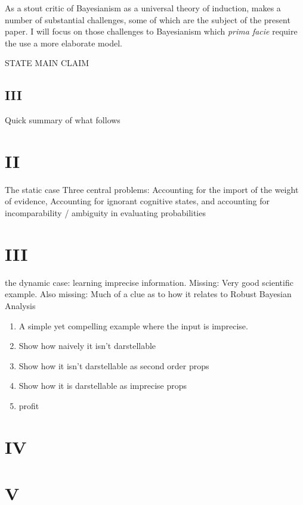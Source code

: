 \documentclass[11pt, a4paper]{scrartcl}
\begin{document}
As a stout critic of Bayesianism as a universal theory of induction, \cite{Norton2011-NORCTB} makes a number of substantial challenges, some of which are the subject of the present paper. I will focus on those challenges to Bayesianism which \emph{prima facie} require the use a more elaborate model.

STATE MAIN CLAIM

\subsection{III}
Quick summary of what follows
\section{II}



The static case
Three central problems: Accounting for the import of the weight of evidence, Accounting for ignorant cognitive states, and accounting for incomparability / ambiguity in evaluating probabilities 
\section{III}
the dynamic case: learning imprecise information. Missing: Very good scientific example. Also missing: Much of a clue as to how it relates to Robust Bayesian Analysis
\begin{enumerate}[label=\roman{*}]
    \item A simple yet compelling example where the input is imprecise.
    \item Show how naively it isn't darstellable
    \item Show how it isn't darstellable as second order props
    \item Show how it is darstellable as imprecise props 
    \item profit
\end{enumerate}
\section{IV}
\section{V}

\begin{singlespacing}
\printbibliography{}
\end{singlespacing}
\end{document}
